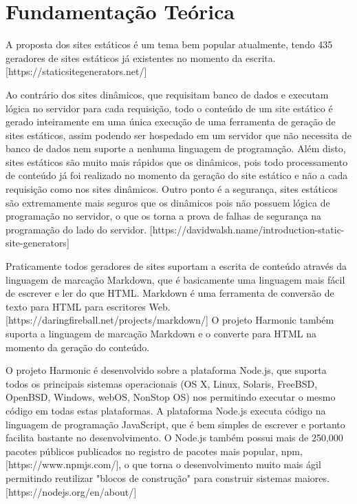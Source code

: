 \documentclass[ppginf, pep]{esinucpel}
\begin{document}
\chapter{Fundamentação Teórica}

A proposta dos sites estáticos é um tema bem popular atualmente, tendo 435 geradores de sites estáticos já existentes no momento da escrita. [https://staticsitegenerators.net/]

Ao contrário dos sites dinâmicos, que requisitam banco de dados e executam lógica no servidor para cada requisição, todo o conteúdo de um site estático é gerado inteiramente em uma única execução de uma ferramenta de geração de sites estáticos, assim podendo ser hospedado em um servidor que não necessita de banco de dados nem suporte a nenhuma linguagem de programação. Além disto, sites estáticos são muito mais rápidos que os dinâmicos, pois todo processamento de conteúdo já foi realizado no momento da geração do site estático e não a cada requisição como nos sites dinâmicos. Outro ponto é a segurança, sites estáticos são extremamente mais seguros que os dinâmicos pois não possuem lógica de programação no servidor, o que os torna a prova de falhas de segurança na programação do lado do servidor. [https://davidwalsh.name/introduction-static-site-generators]

Praticamente todos geradores de sites suportam a escrita de conteúdo através da linguagem de marcação Markdown, que é basicamente uma linguagem mais fácil de escrever e ler do que HTML. Markdown é uma ferramenta de conversão de texto para HTML para escritores Web. [https://daringfireball.net/projects/markdown/] O projeto Harmonic também suporta a linguagem de marcação Markdown e o converte para HTML na momento da geração do conteúdo.

O projeto Harmonic é desenvolvido sobre a plataforma Node.js, que suporta todos os principais sistemas operacionais (OS X, Linux, Solaris, FreeBSD, OpenBSD, Windows, webOS, NonStop OS) nos permitindo executar o mesmo código em todas estas plataformas. A plataforma Node.js executa código na linguagem de programação JavaScript, que é bem simples de escrever e portanto facilita bastante no desenvolvimento. O Node.js também possui mais de 250,000 pacotes públicos publicados no registro de pacotes mais popular, npm, [https://www.npmjs.com/], o que torna o desenvolvimento muito mais ágil permitindo reutilizar "blocos de construção" para construir sistemas maiores. [https://nodejs.org/en/about/] %
\end{document}
